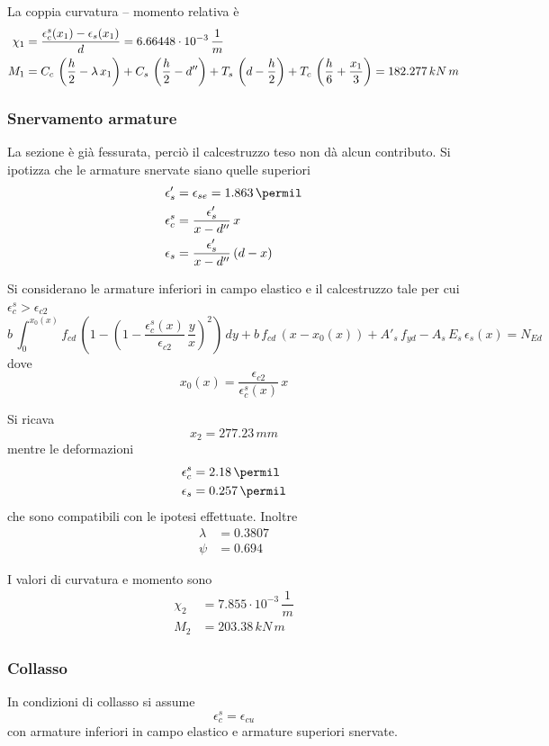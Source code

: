 La coppia curvatura -- momento relativa è
\begin{align}
	\chi_1 &= \dfrac{\epsilon_{c}^s (x_1) - \epsilon_s (x_1)}{d} = 6.66448\cdot 10^{-3}\,\dfrac{1}{m}\\
	\small M_1 &= C_c\,\left(\dfrac{h}{2} - \lambda\,x_1	\right) + C_s\,\left(\dfrac{h}{2}-d''\right) + T_s\,\left(d-\dfrac{h}{2}\right) + T_c\,\left(\dfrac{h}{6}+\dfrac{x_1}{3}\right) = 182.277\,kN\,m
\end{align}

\subsubsection*{Snervamento armature}
La sezione è già fessurata, perciò il calcestruzzo teso non dà alcun contributo. Si ipotizza che le armature snervate siano quelle superiori
\begin{align*}
\epsilon'_s &= \epsilon_{se} = 1.863\,\permil\\
\epsilon_c^s &= \dfrac{\epsilon'_s}{x-d''}\,x\\
\epsilon_s &= \dfrac{\epsilon'_s}{x-d''}\,(d-x)\\
\end{align*}

Si considerano le armature inferiori in campo elastico e il calcestruzzo tale per cui $\epsilon_c^s > \epsilon_{c2}$
\[
b\,\int_0^{x_0(x)} f_{cd}\,\left(1-\left(1-\dfrac{\epsilon_c^s (x)}{\epsilon_{c2}}\,\dfrac{y}{x}\right)^2\right)\,dy + b\,f_{cd}\,\left(x-x_0(x)\right) + A'_s\,f_{yd} - A_s\,E_s\,\epsilon_s(x) = N_{Ed}
\]
dove
\[
x_0(x) = \dfrac{\epsilon_{c2}}{\epsilon_c^s (x)}\,x 	
\]

Si ricava
\[
    x_2 = 277.23\,mm
\]
mentre le deformazioni
\begin{align*}
    \epsilon_c^s &= 2.18\,\permil\\
	\epsilon_s &= 0.257\,\permil
\end{align*}
che sono compatibili con le ipotesi effettuate. Inoltre
\begin{align*}
    \lambda &= 0.3807\\
	\psi &= 0.694
\end{align*}

I valori di curvatura e momento sono
\begin{align}
	\chi_2 &= 7.855\cdot 10^{-3}\,\dfrac{1}{m}\\
	M_2 &= 203.38\,kN\,m
\end{align}

\subsubsection*{Collasso}
In condizioni di collasso si assume
\[
\epsilon_c^s = \epsilon_{cu}
\]
con armature inferiori in campo elastico e armature superiori snervate.


